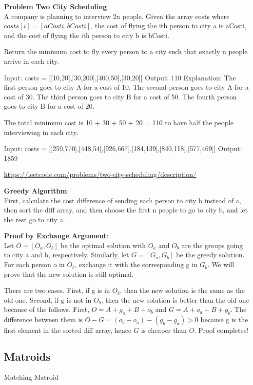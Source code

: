 \documentclass[12pt,article]{article}
\newenvironment{problem}[2][Problem]
    { \begin{mdframed}[backgroundcolor=gray!20] \textbf{#1 #2} \\}
    {  \end{mdframed}}
\begin{document}
\begin{problem}{Two City Scheduling} 
A company is planning to interview 2n people. Given the array costs where $costs[i] = [aCosti, bCosti]$, the cost of flying the ith person to city a is aCosti, and the cost of flying the ith person to city b is bCosti.

Return the minimum cost to fly every person to a city such that exactly n people arrive in each city.

Input: costs = [[10,20],[30,200],[400,50],[30,20]]
Output: 110
Explanation: 
The first person goes to city A for a cost of 10.
The second person goes to city A for a cost of 30.
The third person goes to city B for a cost of 50.
The fourth person goes to city B for a cost of 20.

The total minimum cost is 10 + 30 + 50 + 20 = 110 to have half the people interviewing in each city.

Input: costs = [[259,770],[448,54],[926,667],[184,139],[840,118],[577,469]]
Output: 1859

\url{https://leetcode.com/problems/two-city-scheduling/description/}
\end{problem}

\textbf{Greedy Algorithm}: \\
First, calculate the cost difference of sending each person to city b instead of a, then sort the diff array, and then choose the first n people to go to city b, and let the rest go to city a.

\textbf{Proof by Exchange Argument}: \\
Let $O = [O_a, O_b]$ be the optimal solution with $O_a$ and $O_b$ are the groups going to city a and b, respectively. Similarly, let $G = [G_a, G_b]$ be the greedy solution. For each person o in $O_b$, exchange it with the corresponding g in $G_b$. We will prove that the new solution is still optimal.

There are two cases. First, if g is in $O_b$, then the new solution is the same as the old one. Second, if g is not in $O_b$, then the new solution is better than the old one because of the follows. First, $O = A + g_a + B + o_b$ and $G = A + o_a + B + g_b$. The difference between them is $O - G = (o_b - o_a) - (g_b - g_a) > 0$ because g is the first element in the sorted diff array, hence $G$ is cheaper than $O$. Proof completes!

\newpage
\subsection{Matroids}
Matching Matroid
\end{document}
